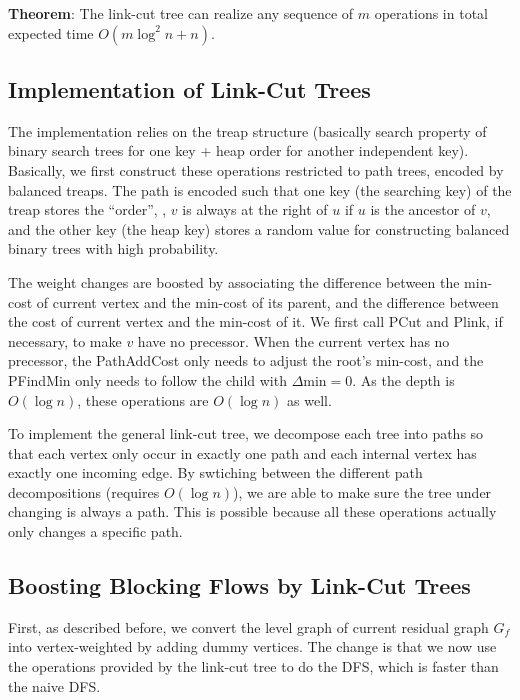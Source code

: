 \textbf{Theorem}: The link-cut tree can realize any sequence of $m$ operations in total expected time $O(m\log^2 n + n)$.

\subsection{Implementation of Link-Cut Trees}

The implementation relies on the treap structure (basically search property of binary search trees for one key + heap order for another independent key). Basically, we first construct these operations restricted to path trees, encoded by balanced treaps. The path is encoded such that one key (the searching key) of the treap stores the ``order'', \ie, $v$ is always at the right of $u$ if $u$ is the ancestor of $v$, and the other key (the heap key) stores a random value for constructing balanced binary trees with high probability.

The weight changes are boosted by associating the difference between the min-cost of current vertex and the min-cost of its parent, and the difference between the cost of current vertex and the min-cost of it. We first call PCut and Plink, if necessary, to make $v$ have no precessor. When the current vertex has no precessor, the PathAddCost only needs to adjust the root's min-cost, and the PFindMin only needs to follow the child with $\Delta \text{min}=0$. As the depth is $O(\log n)$, these operations are $O(\log n)$ as well.

To implement the general link-cut tree, we decompose each tree into paths so that each vertex only occur in exactly one path and each internal vertex has exactly one incoming edge. By swtiching between the different path decompositions (requires $O(\log n)$), we are able to make sure the tree under changing is always a path. This is possible because all these operations actually only changes a specific path.

\subsection{Boosting Blocking Flows by Link-Cut Trees}

First, as described before, we convert the level graph of current residual graph $G_f$ into vertex-weighted by adding dummy vertices. The change is that we now use the operations provided by the link-cut tree to do the DFS, which is faster than the naive DFS.